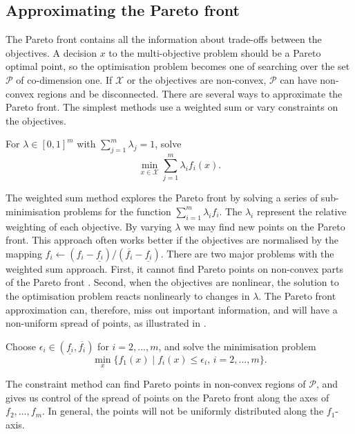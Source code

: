 \documentclass[main.tex]{subfiles}
\begin{document}
\subsection{Approximating the Pareto front}\label{sec:multi_pareto_front}
The Pareto front contains all the information about trade-offs between the
objectives. A decision $x$ to the multi-objective problem
should be a Pareto optimal point, so the
optimisation problem becomes one of searching over the set
$\mathcal{P}$ of co-dimension one. If $\mathcal{X}$ or the objectives are non-convex,
$\mathcal{P}$ can have non-convex regions and be
disconnected.
There are several ways to approximate the Pareto front. The simplest
methods use a weighted sum or vary constraints on the objectives.

\begin{mydef}
  For $\lambda \in {[0,1]}^m$ with $\sum_{j=1}^m\lambda_j = 1$, solve
  \begin{equation}
    \min_{x\in\mathcal{X}} \sum_{j=1}^m \lambda_i f_i(x).
  \end{equation}
\end{mydef}
The weighted sum method explores the Pareto front by solving a series
of sub-minimisation problems for the function $\sum_{i=1}^m\lambda_i f_i$.
The $\lambda_i$ represent the relative weighting of each
objective. By varying $\lambda$  we may find new points on the Pareto front.
This approach often works better if the objectives are normalised by the
mapping $f_i\leftarrow (f_i-\underline
{f_i})/(\overline{f_i}-\underline{f_i})$.
There are two major problems with the weighted sum approach. First,
it cannot find Pareto points on non-convex parts of the Pareto
front \citep{messac2000aggregate}.
Second, when the objectives are nonlinear, the solution to the
optimisation problem reacts nonlinearly to changes in $\lambda$.
The Pareto front approximation can, therefore, miss out important
information, and will
have a non-uniform spread of points, as illustrated in
.

\begin{mydef}
  Choose
  $\epsilon_i\in(\underline{f_i},\overline{f_i})$ for $i=2,\dots,m$, and
  solve the minimisation problem
  \begin{equation}\label{eq:pareto_constraint_method}
    \min_x\{f_1(x)\mid f_i(x)\leq \epsilon_i,\, i=2,\dots,m\}.
  \end{equation}
\end{mydef}
The constraint method can find Pareto points in non-convex regions of
$\mathcal{P}$, and gives us control of the spread of points on the Pareto front
along the axes of $f_2,\dots,f_m$. In general, the points will not be
uniformly distributed along the $f_1$-axis.
\end{document}

